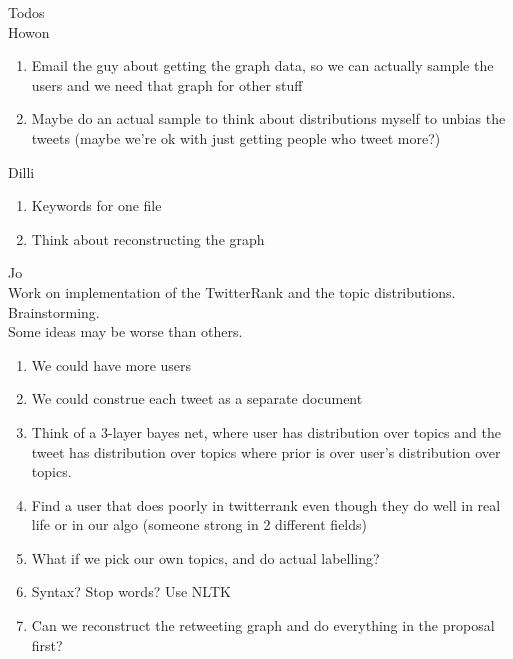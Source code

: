 Todos \\

Howon \\

\begin{enumerate}
\item Email the guy about getting the graph data, so we can actually sample the users and we need that graph for other stuff
\item Maybe do an actual sample to think about distributions myself to unbias the tweets (maybe we're ok with just getting people who tweet more?)
\end{enumerate}

Dilli \\

\begin{enumerate}
\item Keywords for one file
\item Think about reconstructing the graph
\end{enumerate}

Jo \\

Work on implementation of the TwitterRank and the topic distributions. \\

Brainstorming. \\

Some ideas may be worse than others. \\

\begin{enumerate}
\item We could have more users
\item We could construe each tweet as a separate document
\item Think of a 3-layer bayes net, where user has distribution over topics and the tweet has distribution over topics where prior is over user's distribution over topics.
\item Find a user that does poorly in twitterrank even though they do well in real life or in our algo (someone strong in 2 different fields)
\item What if we pick our own topics, and do actual labelling?
\item Syntax? Stop words? Use NLTK
\item Can we reconstruct the retweeting graph and do everything in the proposal first?
\end{enumerate}
